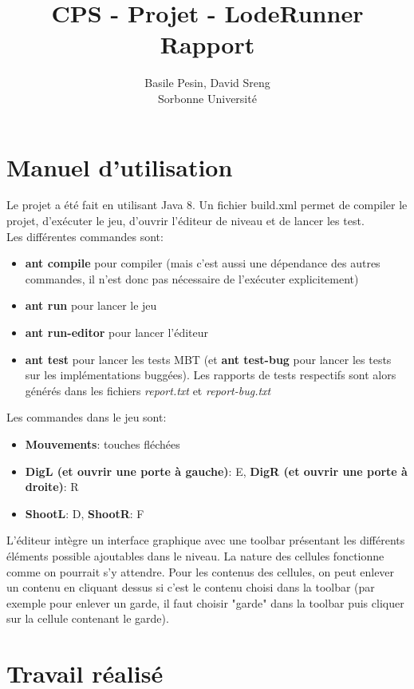 \documentclass{article}
\title{CPS - Projet - LodeRunner\\Rapport}
\author{Basile Pesin, David Sreng\\Sorbonne Université}
\begin{document}
\maketitle

\section{Manuel d'utilisation}

Le projet a été fait en utilisant Java 8. Un fichier build.xml permet de compiler le projet, d'exécuter le jeu, d'ouvrir l'éditeur de niveau et de lancer les test.\\
Les différentes commandes sont:
\begin{itemize}
\item \textbf{ant compile} pour compiler (mais c'est aussi une dépendance des autres commandes, il n'est donc pas nécessaire de l'exécuter explicitement)
\item \textbf{ant run} pour lancer le jeu
\item \textbf{ant run-editor} pour lancer l'éditeur
\item \textbf{ant test} pour lancer les tests MBT (et \textbf{ant test-bug} pour lancer les tests sur les implémentations buggées). Les rapports de tests respectifs sont alors générés dans les fichiers \textit{report.txt} et \textit{report-bug.txt}
\end{itemize}
Les commandes dans le jeu sont:
\begin{itemize}
\item \textbf{Mouvements}: touches fléchées
\item \textbf{DigL (et ouvrir une porte à gauche)}: E, \textbf{DigR (et ouvrir une porte à droite)}: R
\item \textbf{ShootL}: D, \textbf{ShootR}: F
\end{itemize}
L'éditeur intègre un interface graphique avec une toolbar présentant les différents éléments possible ajoutables dans le niveau. La nature des cellules fonctionne comme on pourrait s'y attendre. Pour les contenus des cellules, on peut enlever un contenu en cliquant dessus si c'est le contenu choisi dans la toolbar (par exemple pour enlever un garde, il faut choisir "garde" dans la toolbar puis cliquer sur la cellule contenant le garde). 

\section{Travail réalisé}
\end{document}
